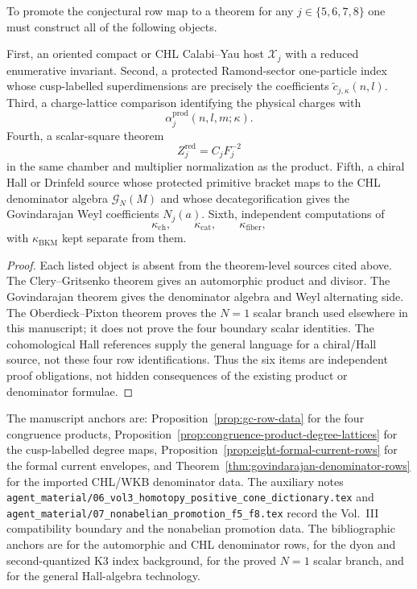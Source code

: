 \begin{theorem}
To promote the conjectural row map to a theorem for any
$j\in\{5,6,7,8\}$ one must construct all of the following objects.

First, an oriented compact or CHL Calabi--Yau host
$\mathcal X_j$ with a reduced enumerative invariant.  Second, a
protected Ramond-sector one-particle index whose cusp-labelled
superdimensions are precisely the coefficients
$\widetilde c_{j,\kappa}(n,l)$.  Third, a charge-lattice comparison
identifying the physical charges with
$$
\alpha_j^{\mathrm{prod}}(n,l,m;\kappa).
$$
Fourth, a scalar-square theorem
$$
Z_j^{\mathrm{red}}=C_jF_j^{-2}
$$
in the same chamber and multiplier normalization as the product.
Fifth, a chiral Hall or Drinfeld source whose protected primitive
bracket maps to the CHL denominator algebra $\mathcal G_N(M)$ and whose
decategorification gives the Govindarajan Weyl coefficients $N_j(a)$.
Sixth, independent computations of
$$
\kappa_{\mathrm{ch}},\qquad
\kappa_{\mathrm{cat}},\qquad
\kappa_{\mathrm{fiber}},
$$
with $\kappa_{\mathrm{BKM}}$ kept separate from them.
\end{theorem}

\begin{proof}
Each listed object is absent from the theorem-level sources cited above.
The Clery--Gritsenko theorem gives an automorphic product and divisor.
The Govindarajan theorem gives the denominator algebra and Weyl
alternating side.  The Oberdieck--Pixton theorem \cite{OPand,OB} proves
the $N=1$ scalar branch used elsewhere in this manuscript; it does not
prove the four boundary scalar identities.  The cohomological Hall
references \cite{KSCoHA,DavisonMeinhardtCoHA} supply the general
language for a chiral/Hall source, not these four row identifications.
Thus the six items are independent proof obligations, not hidden
consequences of the existing product or denominator formulae.
\end{proof}

\begin{remark}
The manuscript anchors are:
Proposition~\ref{prop:gc-row-data} for the four congruence products,
Proposition~\ref{prop:congruence-product-degree-lattices} for the
cusp-labelled degree maps, Proposition~\ref{prop:eight-formal-current-rows}
for the formal current envelopes, and
Theorem~\ref{thm:govindarajan-denominator-rows} for the imported
CHL/WKB denominator data.  The auxiliary notes
\texttt{agent\_material/06\_vol3\_homotopy\_positive\_cone\_dictionary.tex}
and
\texttt{agent\_material/07\_nonabelian\_promotion\_f5\_f8.tex}
record the Vol.~III compatibility boundary and the nonabelian promotion
data.  The bibliographic anchors are \cite{GC,CD09BKM,Gov11BKM} for the
automorphic and CHL denominator rows, \cite{DVV,DMVV} for the dyon and
second-quantized K3 index background, \cite{OPand,OB} for the proved
$N=1$ scalar branch, and \cite{KSCoHA,DavisonMeinhardtCoHA} for the
general Hall-algebra technology.
\end{remark}
